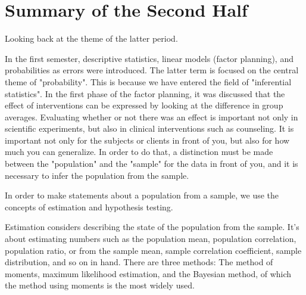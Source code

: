 \documentclass{ltjbook}
\begin{document}
\chapter{Summary of the Second Half}
\label{m30_SecondSemester}
Looking back at the theme of the latter period.

In the first semester, descriptive statistics, linear models (factor planning), and probabilities as errors were introduced.
The latter term is focused on the central theme of "probability". This is because we have entered the field of "inferential statistics".
In the first phase of the factor planning, it was discussed that the effect of interventions can be expressed by looking at the difference in group averages. Evaluating whether or not there was an effect is important not only in scientific experiments, but also in clinical interventions such as counseling. It is important not only for the subjects or clients in front of you, but also for how much you can generalize. In order to do that, a distinction must be made between the "population" and the "sample" for the data in front of you, and it is necessary to infer the population from the sample.

In order to make statements about a population from a sample, we use the concepts of estimation and hypothesis testing.

Estimation considers describing the state of the population from the sample. It's about estimating numbers such as the population mean, population correlation, population ratio, or  from the sample mean, sample correlation coefficient, sample distribution, and so on in hand. There are three methods: The method of moments, maximum likelihood estimation, and the Bayesian method, of which the method using moments is the most widely used.
\end{document}
